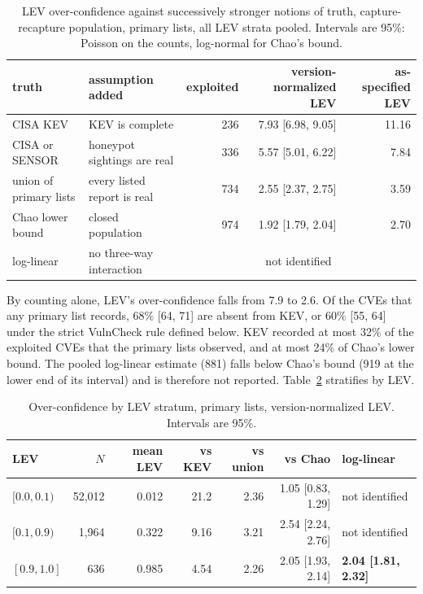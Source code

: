 \begin{table}[t]
\centering\small
\caption{LEV over-confidence against successively stronger notions of truth,
capture-recapture population, primary lists, all LEV strata pooled. Intervals
are 95\%: Poisson on the counts, log-normal for Chao's bound.}\label{tab:ladder}
\setlength{\tabcolsep}{3.5pt}
\begin{tabular}{@{}llrrr@{}}
\toprule
truth & assumption added & exploited & version-normalized LEV & as-specified LEV \\
\midrule
CISA KEV & KEV is complete & 236 & 7.93\x{} [6.98, 9.05] & 11.16\x \\
CISA or SENSOR & honeypot sightings are real & 336 & 5.57\x{} [5.01, 6.22] & 7.84\x \\
union of primary lists & every listed report is real & 734 & 2.55\x{} [2.37, 2.75] & 3.59\x \\
Chao lower bound & closed population & 974 & 1.92\x{} [1.79, 2.04] & 2.70\x \\
log-linear & no three-way interaction & \multicolumn{3}{c}{not identified} \\
\bottomrule
\end{tabular}
\end{table}

By counting alone, LEV's over-confidence falls from 7.9 to 2.6. Of the CVEs
that any primary list records, 68\% [64, 71] are absent from KEV, or 60\%
[55, 64] under the strict VulnCheck rule defined below. KEV
recorded at most 32\% of the exploited CVEs that the primary lists observed,
and at most 24\% of Chao's lower bound. The pooled log-linear estimate (881)
falls below Chao's bound (919 at the lower end of its interval) and is
therefore not reported. Table~\ref{tab:strata} stratifies by LEV.

\begin{table}[t]
\centering\small
\caption{Over-confidence by LEV stratum, primary lists, version-normalized
LEV. Intervals are 95\%.}\label{tab:strata}
\begin{tabular}{@{}lrrrrrl@{}}
\toprule
LEV & $N$ & mean LEV & vs KEV & vs union & vs Chao & log-linear \\
\midrule
$[0.0, 0.1)$ & 52,012 & 0.012 & 21.2\x & 2.36\x & 1.05\x{} [0.83, 1.29] & not identified \\
$[0.1, 0.9)$ & 1,964 & 0.322 & 9.16\x & 3.21\x & 2.54\x{} [2.24, 2.76] & not identified \\
$[0.9, 1.0]$ & 636 & 0.985 & 4.54\x & 2.26\x & 2.05\x{} [1.93, 2.14] & \textbf{2.04\x{} [1.81, 2.32]} \\
\bottomrule
\end{tabular}
\end{table}

